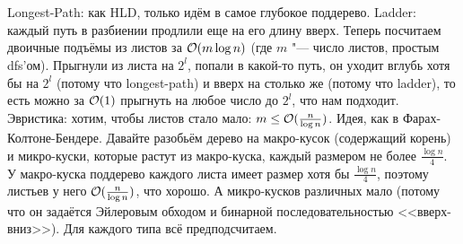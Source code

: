 \section{} %
Longest-Path: как HLD, только идём в самое глубокое поддерево.
Ladder: каждый путь в разбиении продлили еще на его длину вверх.
Теперь посчитаем двоичные подъёмы из листов за $\mathcal{O}(m \log n)$ (где $m$ "--- число листов, простым dfs'ом).
Прыгнули из листа на $2^l$, попали в какой-то путь, он уходит вглубь хотя бы на $2^l$ (потому что longest-path) и вверх на столько же (потому что ladder),
то есть можно за $\mathcal{O}(1)$ прыгнуть на любое число до $2^l$, что нам подходит.
Эвристика: хотим, чтобы листов стало мало: $m \le \mathcal{O}(\frac{n}{\log n})$.
Идея, как в Фарах-Колтоне-Бендере.
Давайте разобьём дерево на макро-кусок (содержащий корень) и микро-куски, которые растут из
макро-куска, каждый размером не более $\frac{\log n}{4}$.
У макро-куска поддерево каждого листа имеет размер хотя бы $\frac{\log n}{4}$, поэтому листьев у него $\mathcal{O}(\frac{n}{\log n})$, что хорошо.
А микро-кусков различных мало (потому что он задаётся Эйлеровым обходом и бинарной последовательностью <<вверх-вниз>>).
Для каждого типа всё предподсчитаем.
